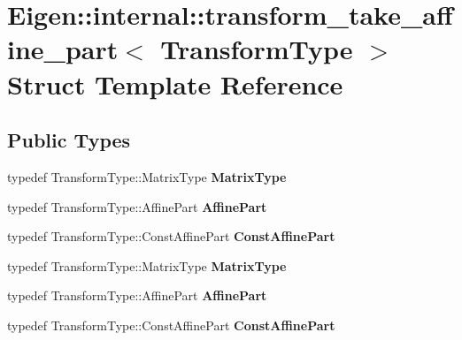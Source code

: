 \hypertarget{struct_eigen_1_1internal_1_1transform__take__affine__part}{}\section{Eigen\+:\+:internal\+:\+:transform\+\_\+take\+\_\+affine\+\_\+part$<$ Transform\+Type $>$ Struct Template Reference}
\label{struct_eigen_1_1internal_1_1transform__take__affine__part}
\subsection*{Public Types}
\begin{DoxyCompactItemize}
\item 
\mbox{\label{struct_eigen_1_1internal_1_1transform__take__affine__part_a21f7faab08ef9da114970a93daed3732}} 
typedef Transform\+Type\+::\+Matrix\+Type {\bfseries Matrix\+Type}
\item 
\mbox{\label{struct_eigen_1_1internal_1_1transform__take__affine__part_a127d3f494b464ed3cad0448e5cdf6626}} 
typedef Transform\+Type\+::\+Affine\+Part {\bfseries Affine\+Part}
\item 
\mbox{\label{struct_eigen_1_1internal_1_1transform__take__affine__part_a6be9d50c0b1ed13a22abb10c208b59de}} 
typedef Transform\+Type\+::\+Const\+Affine\+Part {\bfseries Const\+Affine\+Part}
\item 
\mbox{\label{struct_eigen_1_1internal_1_1transform__take__affine__part_a21f7faab08ef9da114970a93daed3732}} 
typedef Transform\+Type\+::\+Matrix\+Type {\bfseries Matrix\+Type}
\item 
\mbox{\label{struct_eigen_1_1internal_1_1transform__take__affine__part_a127d3f494b464ed3cad0448e5cdf6626}} 
typedef Transform\+Type\+::\+Affine\+Part {\bfseries Affine\+Part}
\item 
\mbox{\label{struct_eigen_1_1internal_1_1transform__take__affine__part_a6be9d50c0b1ed13a22abb10c208b59de}} 
typedef Transform\+Type\+::\+Const\+Affine\+Part {\bfseries Const\+Affine\+Part}
\end{DoxyCompactItemize}
